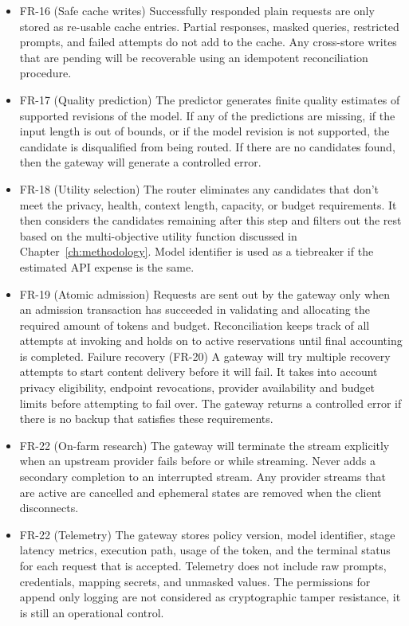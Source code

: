\documentclass{FastFyp}
\begin{document}
\begin{itemize}
\item FR-16 (Safe cache writes)
Successfully responded plain requests are only stored as re-usable cache entries. Partial responses, masked queries, restricted prompts, and failed attempts do not add to the cache. Any cross-store writes that are pending will be recoverable using an idempotent reconciliation procedure.
\item FR-17 (Quality prediction)
The predictor generates finite quality estimates of supported revisions of the model. If any of the predictions are missing, if the input length is out of bounds, or if the model revision is not supported, the candidate is disqualified from being routed. If there are no candidates found, then the gateway will generate a controlled error.
\item FR-18 (Utility selection)
The router eliminates any candidates that don't meet the privacy, health, context length, capacity, or budget requirements. It then considers the candidates remaining after this step and filters out the rest based on the multi-objective utility function discussed in Chapter~\ref{ch:methodology}. Model identifier is used as a tiebreaker if the estimated API expense is the same.
\item FR-19 (Atomic admission)
Requests are sent out by the gateway only when an admission transaction has succeeded in validating and allocating the required amount of tokens and budget. Reconciliation keeps track of all attempts at invoking and holds on to active reservations until final accounting is completed.
Failure recovery (FR-20)
A gateway will try multiple recovery attempts to start content delivery before it will fail. It takes into account privacy eligibility, endpoint revocations, provider availability and budget limits before attempting to fail over. The gateway returns a controlled error if there is no backup that satisfies these requirements.
\item FR-22 (On-farm research)
The gateway will terminate the stream explicitly when an upstream provider fails before or while streaming. Never adds a secondary completion to an interrupted stream. Any provider streams that are active are cancelled and ephemeral states are removed when the client disconnects.
\item FR-22 (Telemetry)
The gateway stores policy version, model identifier, stage latency metrics, execution path, usage of the token, and the terminal status for each request that is accepted. Telemetry does not include raw prompts, credentials, mapping secrets, and unmasked values. The permissions for append only logging are not considered as cryptographic tamper resistance, it is still an operational control.
\end{itemize}
\end{document}
